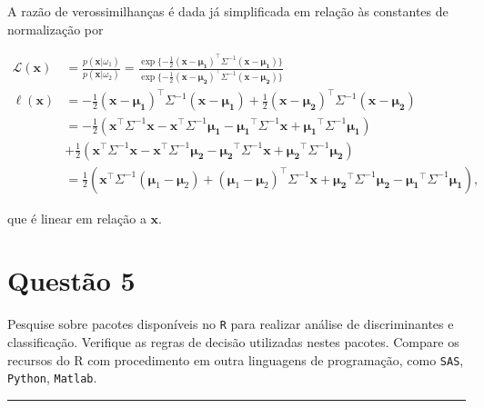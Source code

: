 \documentclass[
  a4paperpaper,
]{article}
\begin{document}
A razão de verossimilhanças é dada já simplificada em relação às
constantes de normalização por

\begin{align}
  \mathcal{L}(\boldsymbol{x}) &= \frac{p(\boldsymbol{x}|\omega_1)}{p(\boldsymbol{x}|\omega_2)} = \frac{\exp \{ -\frac{1}{2} (\boldsymbol{x} - \boldsymbol{\mu_1})^\top \Sigma^{-1} (\boldsymbol{x} - \boldsymbol{\mu_1}) \}}{\exp \{ -\frac{1}{2} (\boldsymbol{x} - \boldsymbol{\mu_2})^\top \Sigma^{-1} (\boldsymbol{x} - \boldsymbol{\mu_2}) \}} \\
 \ell(\boldsymbol{x}) &=  -\frac{1}{2} (\boldsymbol{x} - \boldsymbol{\mu_1})^\top \Sigma^{-1} (\boldsymbol{x} - \boldsymbol{\mu_1}) + \frac{1}{2} (\boldsymbol{x} - \boldsymbol{\mu_2})^\top \Sigma^{-1} (\boldsymbol{x} - \boldsymbol{\mu_2})\nonumber \\
 &= -\frac{1}{2} \left( \boldsymbol{x}^\top \Sigma^{-1} \boldsymbol{x} - \boldsymbol{x}^\top \Sigma^{-1} \boldsymbol{\mu_1}  - \boldsymbol{\mu_1}^\top \Sigma^{-1} \boldsymbol{x} +  \boldsymbol{\mu_1}^\top \Sigma^{-1} \boldsymbol{\mu_1} \right) \nonumber \\
&+ \frac{1}{2} \left( \boldsymbol{x}^\top \Sigma^{-1} \boldsymbol{x} - \boldsymbol{x}^\top \Sigma^{-1} \boldsymbol{\mu_2}  - \boldsymbol{\mu_2}^\top \Sigma^{-1} \boldsymbol{x} +  \boldsymbol{\mu_2}^\top \Sigma^{-1} \boldsymbol{\mu_2} \right) \nonumber \\
&= \frac{1}{2} \left( \boldsymbol{x}^\top \Sigma^{-1} (\boldsymbol{\mu}_1 - \boldsymbol{\mu}_2) + (\boldsymbol{\mu}_1 - \boldsymbol{\mu}_2)^\top \Sigma^{-1} \boldsymbol{x} + \boldsymbol{\mu_2}^\top \Sigma^{-1} \boldsymbol{\mu_2}  - \boldsymbol{\mu_1}^\top \Sigma^{-1} \boldsymbol{\mu_1}   \right),
\end{align}

que é linear em relação a \(\boldsymbol{x}\).

\newpage{}

\section{Questão 5}\label{questuxe3o-5}

Pesquise sobre pacotes disponíveis no \texttt{R} para realizar análise
de discriminantes e classificação. Verifique as regras de decisão
utilizadas nestes pacotes. Compare os recursos do R com procedimento em
outra linguagens de programação, como \texttt{SAS}, \texttt{Python},
\texttt{Matlab}.

\begin{center}\rule{0.5\linewidth}{0.5pt}\end{center}
\end{document}
